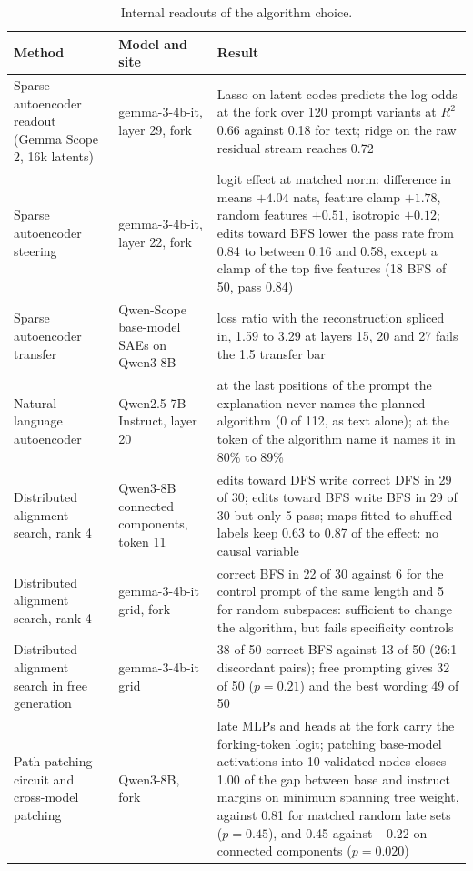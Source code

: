 \documentclass[11pt,letterpaper]{article}
\begin{document}
\begin{table}[!htbp]
\centering
\footnotesize
\caption{Internal readouts of the algorithm choice.}
\label{tab:readouts}
\begin{tabularx}{\linewidth}{@{}L{3.3cm}L{3.3cm}Y@{}}
\toprule
Method & Model and site & Result \\
\midrule
Sparse autoencoder readout (Gemma Scope 2, 16k latents) & gemma-3-4b-it, layer 29, fork & Lasso on latent codes predicts the log odds at the fork over 120 prompt variants at $R^2$ 0.66 against 0.18 for text; ridge on the raw residual stream reaches 0.72 \\
Sparse autoencoder steering & gemma-3-4b-it, layer 22, fork & logit effect at matched norm: difference in means $+4.04$ nats, feature clamp $+1.78$, random features $+0.51$, isotropic $+0.12$; edits toward BFS lower the pass rate from 0.84 to between 0.16 and 0.58, except a clamp of the top five features (18 BFS of 50, pass 0.84) \\
Sparse autoencoder transfer & Qwen-Scope base-model SAEs on Qwen3-8B & loss ratio with the reconstruction spliced in, 1.59 to 3.29 at layers 15, 20 and 27 fails the 1.5 transfer bar \\
Natural language autoencoder & Qwen2.5-7B-Instruct, layer 20 & at the last positions of the prompt the explanation never names the planned algorithm (0 of 112, as text alone); at the token of the algorithm name it names it in 80\% to 89\% \\
Distributed alignment search, rank 4 & Qwen3-8B connected components, token 11 & edits toward DFS write correct DFS in 29 of 30; edits toward BFS write BFS in 29 of 30 but only 5 pass; maps fitted to shuffled labels keep 0.63 to 0.87 of the effect: no causal variable \\
Distributed alignment search, rank 4 & gemma-3-4b-it grid, fork & correct BFS in 22 of 30 against 6 for the control prompt of the same length and 5 for random subspaces: sufficient to change the algorithm, but fails specificity controls \\
Distributed alignment search in free generation & gemma-3-4b-it grid & 38 of 50 correct BFS against 13 of 50 (26:1 discordant pairs); free prompting gives 32 of 50 ($p = 0.21$) and the best wording 49 of 50 \\
Path-patching circuit and cross-model patching & Qwen3-8B, fork & late MLPs and heads at the fork carry the forking-token logit; patching base-model activations into 10 validated nodes closes 1.00 of the gap between base and instruct margins on minimum spanning tree weight, against 0.81 for matched random late sets ($p = 0.45$), and 0.45 against $-0.22$ on connected components ($p = 0.020$) \\

\end{tabularx}
\end{table}
\end{document}
